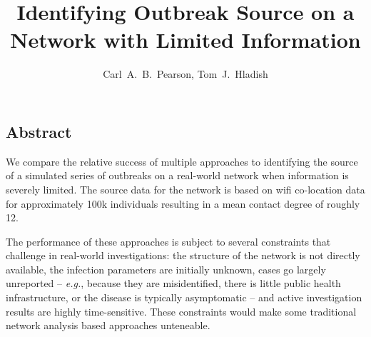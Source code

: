 \documentclass{article}
\author{Carl~A.~B.~Pearson, Tom~J.~Hladish}
\begin{document}

\title{Identifying Outbreak Source on a Network with Limited Information}

\maketitle
\begin{centering}
\section*{Abstract}
\end{centering}
We compare the relative success of multiple approaches to identifying the source of a simulated series of outbreaks on a real-world network when information is severely limited. The source data for the network is based on wifi co-location data for approximately 100k individuals resulting in a mean contact degree of roughly 12.

The performance of these approaches is subject to several constraints that challenge in real-world investigations: the structure of the network is not directly available, the infection parameters are initially unknown, cases go largely unreported -- {\em e.g.}, because they are misidentified, there is little public health infrastructure, or the disease is typically asymptomatic -- and active investigation results are highly time-sensitive.  These constraints would make some traditional network analysis based approaches unteneable.


% 
\end{document}
